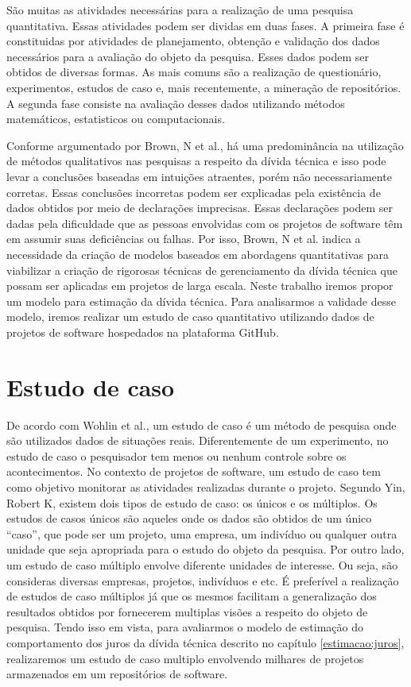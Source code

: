 São muitas as atividades necessárias para a realização de uma pesquisa quantitativa. Essas atividades podem ser dividas em duas fases. A primeira fase é constituidas por atividades de planejamento, obtenção e validação dos dados necessários para a avaliação do objeto da pesquisa. Esses dados podem ser obtidos de diversas formas. As mais comuns são a realização de questionário, experimentos, estudos de caso e, mais recentemente, a mineração de repositórios. A segunda fase consiste na avaliação desses dados utilizando métodos matemáticos, estatisticos ou computacionais.  

Conforme argumentado por Brown, N et al.\cite{brown2010managing}, há uma predominância na utilização de métodos qualitativos nas pesquisas a respeito da dívida técnica e isso pode levar a conclusões baseadas em intuições atraentes, porém não necessariamente corretas. Essas conclusões incorretas podem ser explicadas pela existência de dados obtidos por meio de declarações imprecisas. Essas declarações podem ser dadas pela dificuldade que as pessoas envolvidas com os projetos de software têm em assumir suas deficiências ou falhas. Por isso, Brown, N et al.\cite{brown2010managing} indica a necessidade da criação de modelos baseados em abordagens quantitativas para viabilizar a criação de rigorosas técnicas de gerenciamento da dívida técnica que possam ser aplicadas em projetos de larga escala. Neste trabalho iremos propor um modelo para estimação da dívida técnica. Para analisarmos a validade desse modelo, iremos realizar um estudo de caso quantitativo utilizando dados de projetos de software hospedados na plataforma GitHub. 

\section{Estudo de caso}

 De acordo com Wohlin et al.\cite{wohlin2003empirical}, um estudo de caso é um método de pesquisa onde são utilizados dados de situações reais. Diferentemente de um experimento, no estudo de caso o pesquisador tem menos ou nenhum controle sobre os acontecimentos.  No contexto de projetos de software, um estudo de caso tem como objetivo monitorar as atividades realizadas durante o projeto. Segundo Yin, Robert K\cite{yin2011applications}, existem dois tipos de estudo de caso: os únicos e os múltiplos. Os estudos de casos únicos são aqueles onde os dados são obtidos de um único ``caso'',  que pode ser um projeto, uma empresa, um indivíduo ou qualquer outra unidade que seja apropriada para o estudo do objeto da pesquisa. Por outro lado, um estudo de caso múltiplo envolve diferente unidades de interesse. Ou seja, são consideras diversas empresas, projetos, indivíduos e etc. É preferível a realização de estudos de caso múltiplos já que os mesmos facilitam a generalização dos resultados obtidos por fornecerem multiplas visões a respeito do objeto de pesquisa. Tendo isso em vista,  para avaliarmos o modelo de estimação do comportamento dos juros da dívida técnica descrito no capítulo \ref{estimacao:juros}, realizaremos um estudo de caso multiplo envolvendo milhares de projetos armazenados em um repositórios de software.


